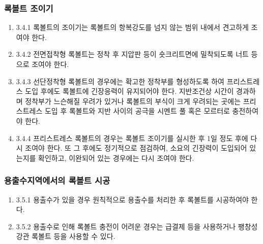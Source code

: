 \documentclass[12pt,a4paper]{article}
\begin{document}
\subsubsection{록볼트 조이기}
\begin{enumerate}
\item  3.4.1 록볼트의 조이기는 록볼트의 항복강도를 넘지 않는 범위 내에서 견고하게 조여야 한다.  
\item  3.4.2 전면접착형 록볼트는 정착 후 지압판 등이 숏크리트면에 밀착되도록 너트 등으로 조여야 한다.  
\item  3.4.3 선단정착형 록볼트의 경우에는 확고한 정착부를 형성하도록 하여 프리스트레스 도입 후에도 록볼트에 긴장응력이 유지되어야 한다. 지반조건상 시간이 경과하며 정착부가 느슨해질 우려가 있거나 록볼트의 부식이 크게 우려되는 곳에는 프리스트레스 도입 후 록볼트와 지반 사이의 공극을 시멘트 풀 혹은 모르터로 충전하여야 한다.  
\item  3.4.4 프리스트레스 록볼트의 경우는 록볼트 조이기를 실시한 후 1일 정도 후에 다시 조여야 한다. 또 그 후에도 정기적으로 점검하여, 소요의 긴장력이 도입되어 있는지를 확인하고, 이완되어 있는 경우에는 다시 조여야 한다.  
\end{enumerate}

\subsubsection{용출수지역에서의 록볼트 시공}
\begin{enumerate}
\item  3.5.1 용출수가 있을 경우 원칙적으로 용출수를 처리한 후 록볼트를 시공하여야 한다.  
\item  3.5.2 용출수로 인해 록볼트 충전이 어려운 경우는 급결제 등을 사용하거나 팽창성 강관 록볼트 등을 사용할 수 있다.  
\end{enumerate}
\end{document}

